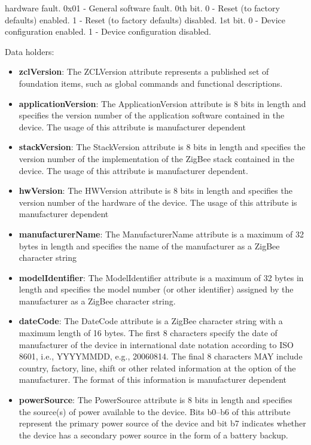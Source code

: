 hardware fault. 				0x01 - General software fault. 				0th bit. 				 0 - Reset (to factory defaults) enabled. 				 1 - Reset (to factory defaults) disabled. 				1st bit. 				 0 - Device configuration enabled. 				 1 - Device configuration disabled.
\newline

\noindent
Data holders:

\begin{itemize}
\item \textbf{zclVersion}: The ZCLVersion attribute represents a published set of foundation items, such as global commands and functional descriptions.
\item \textbf{applicationVersion}: The ApplicationVersion attribute is 8 bits in length and specifies the version number of the application software contained in the device. The usage of this attribute is manufacturer dependent
\item \textbf{stackVersion}: The StackVersion attribute is 8 bits in length and specifies the version number of the implementation of the ZigBee stack contained in the device. The usage of this attribute is manufacturer dependent.
\item \textbf{hwVersion}: The HWVersion attribute is 8 bits in length and specifies the version number of the hardware of the device. The usage of this attribute is manufacturer dependent
\item \textbf{manufacturerName}: The ManufacturerName attribute is a maximum of 32 bytes in length and specifies the name of the manufacturer as a ZigBee character string
\item \textbf{modelIdentifier}: The ModelIdentifier attribute is a maximum of 32 bytes in length and specifies the model number (or other identifier) assigned by the manufacturer as a ZigBee character string.
\item \textbf{dateCode}: The DateCode attribute is a ZigBee character string with a maximum length of 16 bytes. The first 8 characters specify the date of manufacturer of the device in international date notation according to ISO 8601, i.e., YYYYMMDD, e.g., 20060814. The final 8 characters MAY include country, factory, line, shift or other related information at the option of the manufacturer. The format of this information is manufacturer dependent
\item \textbf{powerSource}: The PowerSource attribute is 8 bits in length and specifies the source(s) of power available to the device. Bits b0–b6 of this attribute represent the primary power source of the device and bit b7 indicates whether the device has a secondary power source in the form of a battery backup.

\end{itemize}
